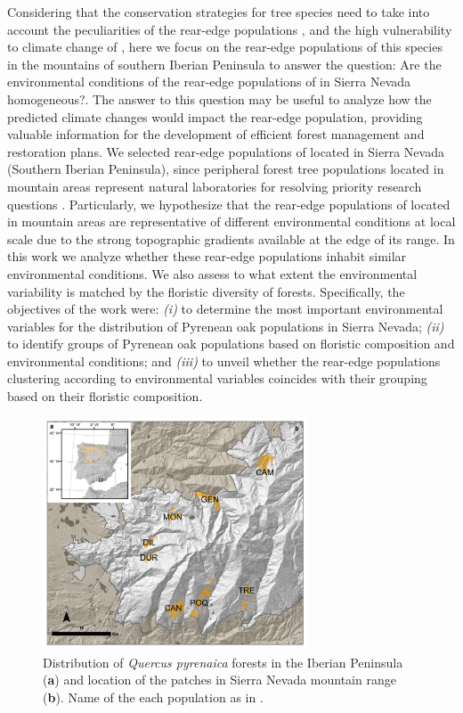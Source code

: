 Considering that the conservation strategies for tree species need to take into account the peculiarities of the rear-edge populations \autocite{HampePetit2005ConservingBiodiversity,Fadyetal2016EvolutionbasedApproach,Rehmetal2015LosingYour}, and the high vulnerability to climate change of \Qp \autocite{GarciaValdesetal2013ChasingMoving}, here we focus on the rear-edge populations of this species in the mountains of southern Iberian Peninsula to answer the question: Are the environmental conditions of the rear-edge populations of \Qp in Sierra Nevada homogeneous?. The answer to this question may be useful to analyze how the predicted climate changes would impact the rear-edge population, providing valuable information for the development of efficient forest management and restoration plans. We selected rear-edge populations of \Qp located in Sierra Nevada (Southern Iberian Peninsula), since peripheral forest tree populations located in mountain areas represent natural laboratories for resolving priority research questions \autocite{Fadyetal2016EvolutionbasedApproach}. Particularly, we hypothesize that the rear-edge populations of \Qp located in mountain areas are representative of different environmental conditions at local scale due to the strong topographic gradients available at the edge of its range. In this work we analyze whether these rear-edge populations inhabit similar environmental conditions. We also assess to what extent the environmental variability is matched by the floristic diversity of \Qp forests. Specifically, the objectives of the work were: \emph{(i)} to determine the most important environmental variables for the distribution of Pyrenean oak populations in Sierra Nevada; \emph{(ii)} to identify groups of Pyrenean oak populations based on floristic composition and environmental conditions; and \emph{(iii)} to unveil whether the rear-edge populations clustering according to environmental variables coincides with their grouping based on their floristic composition.

\begin{figure}
	\centering
	\includegraphics[width=0.7\textwidth]{img/multivariante/dist_map_multivariante} \caption{Distribution of \textit{Quercus pyrenaica} forests in the Iberian Peninsula (\textbf{a}) and location of the patches in Sierra Nevada mountain range (\textbf{b}). Name of the each population as in .}\label{fig:location-map}
\end{figure}

